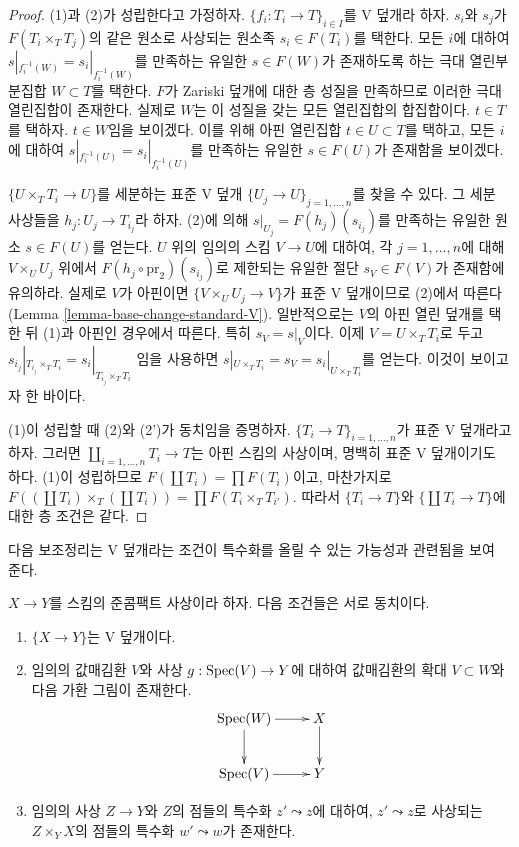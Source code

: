 \begin{proof}
(1)과 (2)가 성립한다고 가정하자. $\{f_i : T_i \to T\}_{i \in I}$를 V
덮개라 하자. $s_i$와 $s_j$가 $F(T_i \times_T T_j)$의 같은 원소로 사상되는
원소족 $s_i \in F(T_i)$를 택한다. 모든 $i$에 대하여
$s|_{f_i^{-1}(W)} = s_i|_{f_i^{-1}(W)}$를 만족하는 유일한
$s \in F(W)$가 존재하도록 하는 극대 열린부분집합 $W \subset T$를 택한다.
$F$가 Zariski 덮개에 대한 층 성질을 만족하므로 이러한 극대 열린집합이
존재한다. 실제로 $W$는 이 성질을 갖는 모든 열린집합의 합집합이다.
$t \in T$를 택하자. $t \in W$임을 보이겠다. 이를 위해 아핀 열린집합
$t \in U \subset T$를 택하고, 모든 $i$에 대하여
$s|_{f_i^{-1}(U)} = s_i|_{f_i^{-1}(U)}$를 만족하는 유일한
$s \in F(U)$가 존재함을 보이겠다.

\medskip\noindent
$\{U \times_T T_i \to U\}$를 세분하는 표준 V 덮개
$\{U_j \to U\}_{j = 1, \ldots, n}$를 찾을 수 있다. 그 세분 사상들을
$h_j : U_j \to T_{i_j}$라 하자. (2)에 의해
$s|_{U_j} = F(h_j)(s_{i_j})$를 만족하는 유일한 원소 $s \in F(U)$를
얻는다. $U$ 위의 임의의 스킴 $V \to U$에 대하여, 각
$j = 1, \ldots, n$에 대해 $V \times_U U_j$ 위에서
$F(h_j \circ \text{pr}_2)(s_{i_j})$로 제한되는 유일한 절단
$s_V \in F(V)$가 존재함에 유의하라. 실제로 $V$가 아핀이면
$\{V \times_U U_j \to V\}$가 표준 V 덮개이므로 (2)에서 따른다
(Lemma \ref{lemma-base-change-standard-V}). 일반적으로는 $V$의 아핀 열린
덮개를 택한 뒤 (1)과 아핀인 경우에서 따른다. 특히 $s_V = s|_V$이다.
이제 $V = U \times_T T_i$로 두고
$s_{i_j}|_{T_{i_j} \times_T T_i} = s_i|_{T_{i_j} \times_T T_i}$
임을 사용하면 $s|_{U \times_T T_i} = s_V = s_i|_{U \times_T T_i}$를
얻는다. 이것이 보이고자 한 바이다.

\medskip\noindent
(1)이 성립할 때 (2)와 (2')가 동치임을 증명하자.
$\{T_i \to T\}_{i = 1, \ldots, n}$가 표준 V 덮개라고 하자. 그러면
$\coprod_{i = 1, \ldots, n} T_i \to T$는 아핀 스킴의 사상이며, 명백히
표준 V 덮개이기도 하다. (1)이 성립하므로
$F(\coprod T_i) = \prod F(T_i)$이고, 마찬가지로
$F((\coprod T_i) \times_T (\coprod T_i)) = \prod F(T_i \times_T T_{i'})$.
따라서 $\{T_i \to T\}$와 $\{\coprod T_i \to T\}$에 대한 층 조건은
같다.
\end{proof}

\noindent
다음 보조정리는 V 덮개라는 조건이 특수화를 올릴 수 있는 가능성과 관련됨을
보여 준다.

\begin{lemma}
\label{lemma-refine-qcqs-V}
$X \to Y$를 스킴의 준콤팩트 사상이라 하자. 다음 조건들은 서로 동치이다.
\begin{enumerate}
\item $\{X \to Y\}$는 V 덮개이다.
\item 임의의 값매김환 $V$와 사상 $g : \mathop{\mathrm{Spec}}(V) \to Y$에 대하여 값매김환의
확대 $V \subset W$와 다음 가환 그림이 존재한다.
$$
\xymatrix{
\Spec(W) \ar[r] \ar[d] & X \ar[d] \\
\Spec(V) \ar[r] & Y
}
$$
\item 임의의 사상 $Z \to Y$와 $Z$의 점들의 특수화 $z' \leadsto z$에
대하여, $z' \leadsto z$로 사상되는 $Z \times_Y X$의 점들의 특수화
$w' \leadsto w$가 존재한다.
\end{enumerate}
\end{lemma}

